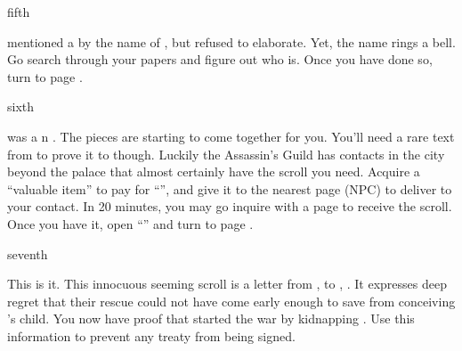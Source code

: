 \documentclass[greennotebook]{NeptuneBall}
\begin{document}
\begin{page}{fifth}

\cManta{} mentioned a \cMother{\human} by the name of \cMother{}, but refused to elaborate. Yet, the name rings a bell. Go search through your papers and figure out who \cMother{\they} is. Once you have done so, turn to page .

\end{page}

\begin{page}{sixth}

\cMother{} was a \pPacifica{}n \cMother{\prince}. The pieces are starting to come together for you. You'll need a rare text from \pPacifica{} to prove it to \cPrince{} though. Luckily the Assassin's Guild has contacts in the city beyond the palace that almost certainly have the scroll you need. Acquire a ``valuable item'' to pay for ``\iScroll{}'', and give it to the nearest page (NPC) to deliver to your contact. In 20 minutes, you may go inquire with a page to receive the scroll. Once you have it, open ``\iScroll{}'' and turn to page .

\end{page}

\begin{page}{seventh}

This is it. This innocuous seeming scroll is a letter from \cMotherBrother{\prince} \cMotherBrother{}, to \cMotherBrother{\their} \cMother{\sibling}, \cMother{\prince} \cMother{}. It expresses \cMotherBrother{\their} deep regret that their rescue could not have come early enough to save \cMother{} from conceiving \cExExKing{}'s child. You now have proof that \pAtlantis{} started the war by kidnapping \cMother{\prince} \cMother{}. Use this information to prevent any treaty from being signed.

\end{page}

\endnotebook
\end{document}
